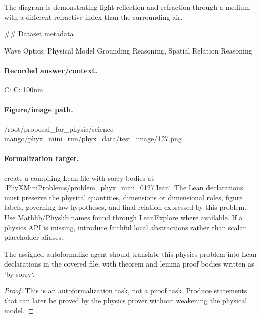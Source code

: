 The diagram is demonstrating light reflection and refraction through a medium with a different refractive index than the surrounding air.

\#\# Dataset metadata

Wave Optics; Physical Model Grounding Reasoning, Spatial Relation Reasoning

\paragraph{Recorded answer/context.}
C: C: 100nm

\paragraph{Figure/image path.}
/root/proposal\_for\_physic/science-mango/phyx\_mini\_run/phyx\_data/test\_image/127.png

\paragraph{Formalization target.}
create a compiling Lean file with sorry bodies at `PhyXMiniProblems/problem\_phyx\_mini\_0127.lean`. The Lean declarations must preserve the physical quantities, dimensions or dimensional roles, figure labels, governing-law hypotheses, and final relation expressed by this problem.
Use Mathlib/Physlib names found through LeanExplore where available. If a physics API is missing, introduce faithful local abstractions rather than scalar placeholder aliases.

\begin{theorem}
\label{thm:physics:phyx_mini_0127:target}
The assigned autoformalize agent should translate this physics problem into Lean declarations in the covered file, with theorem and lemma proof bodies written as `by sorry`.
\end{theorem}
\begin{proof}
This is an autoformalization task, not a proof task. Produce statements that can later be proved by the physics prover without weakening the physical model.
\end{proof}

